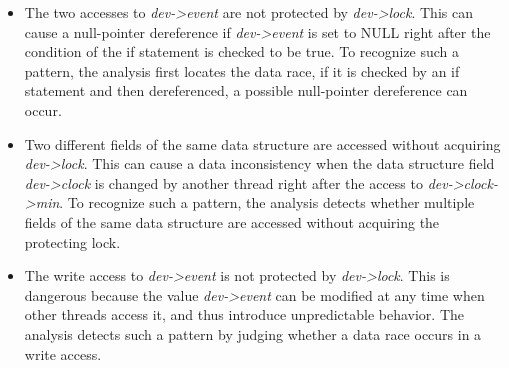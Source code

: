 \begin{itemize}
	\item {} The two accesses to {\em dev->event} 
	are not protected by {\em dev->lock}. This can cause a null-pointer 
	dereference if {\em dev->event} is set to NULL right after the condition of 
	the if statement is checked to be true. To recognize such a pattern, the 
	analysis first locates the data race, if it is checked by an if statement 
	and then dereferenced, a possible null-pointer dereference can occur.
	\item {} Two different fields of the same data 
	structure are accessed without acquiring {\em dev->lock}. This can cause a 
	data inconsistency when the data structure field {\em dev->clock} is 
	changed by another thread right after the access to {\em dev->clock->min}. 
	To recognize such a pattern, the analysis detects whether multiple fields 
	of 	the same data structure are accessed without acquiring the protecting 
	lock.
	\item {} The write access to {\em dev->event} is not 
	protected by {\em dev->lock}. This is dangerous because the value {\em 
	dev->event} can be modified at any time when other threads access it, and 
	thus introduce unpredictable behavior. The analysis detects such a pattern 
	by judging whether a data race occurs in a write access.
\end{itemize}
